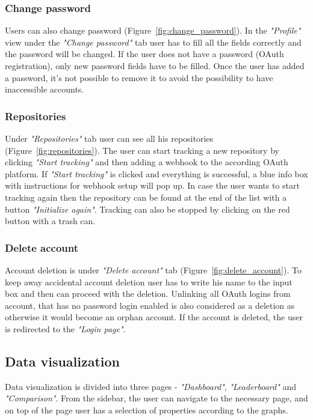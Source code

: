 \subsubsection{Change password}\label{subsubsec:change-password}
Users can also change password (Figure~\ref{fig:change_password}).
In the \textit{"Profile"} view under the \textit{"Change password"} tab user has to fill all the fields correctly and the password will be changed.
If the user does not have a password (OAuth registration), only new password fields have to be filled.
Once the user has added a password, it's not possible to remove it to avoid the possibility to have inaccessible accounts.

\subsubsection{Repositories}\label{subsubsec:repositories}
Under \textit{"Repositories"} tab user can see all his repositories (Figure~\ref{fig:repositories}).
The user can start tracking a new repository by clicking \textit{"Start tracking"} and then adding a webhook to the according OAuth platform.
If \textit{"Start tracking"} is clicked and everything is successful, a blue info box with instructions for webhook setup will pop up.
In case the user wants to start tracking again then the repository can be found at the end of the list with a button \textit{"Initialize again"}.
Tracking can also be stopped by clicking on the red button with a trash can.

\subsubsection{Delete account}\label{subsubsec:delete-account}
Account deletion is under \textit{"Delete account"} tab (Figure~\ref{fig:delete_account}).
To keep away accidental account deletion user has to write his name to the input box and then can proceed with the deletion.
Unlinking all OAuth logins from account, that has no password login enabled is also considered as a deletion as otherwise it would become
an orphan account.
If the account is deleted, the user is redirected to the \textit{"Login page"}.

\subsection{Data visualization}\label{subsec:data-visualization}
Data visualization is divided into three pages - \textit{"Dashboard"}, \textit{"Leaderboard"} and \textit{"Comparison"}.
From the sidebar, the user can navigate to the necessary page, and on top of the page user has a selection of properties according to the graphs.

